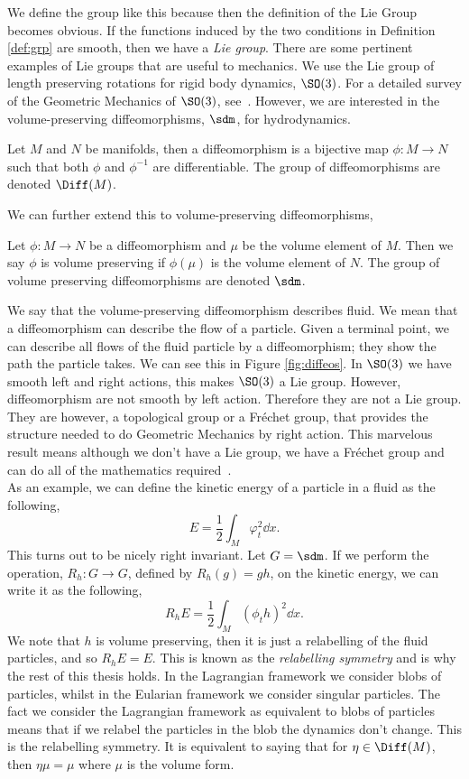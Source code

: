 \noindent
We define the group like this because then the definition of the Lie Group becomes obvious. If the functions induced by the two conditions in Definition \ref{def:grp} are smooth, then we have a \textit{Lie group}. There are some pertinent examples of Lie groups that are useful to mechanics. We use the Lie group of length preserving rotations for rigid body dynamics, $\SO(3)$. For a detailed survey of the Geometric Mechanics of $\SO(3)$, see~\cite{arthur}. However, we are interested in the volume-preserving diffeomorphisms, $\sdm$, for hydrodynamics.
\begin{ndefi}[Diffeomorphism]
  Let $M$ and $N$ be manifolds, then a diffeomorphism is a bijective map $\phi: M \to N$ such that both $\phi$ and $\phi^{-1}$ are differentiable. The group of diffeomorphisms are denoted $\Diff(M)$.
\end{ndefi}
\noindent
We can further extend this to volume-preserving diffeomorphisms,
\begin{ndefi}
  Let $\phi : M \to N$ be a diffeomorphism and $\mu$ be the volume element of $M$. Then we say $\phi$ is volume preserving if $\phi(\mu)$ is the volume element of $N$. The group of volume preserving diffeomorphisms are denoted $\sdm$.
\end{ndefi}
\noindent
We say that the volume-preserving diffeomorphism describes fluid. We mean that a diffeomorphism can describe the flow of a particle. Given a terminal point, we can describe all flows of the fluid particle by a diffeomorphism; they show the path the particle takes. We can see this in Figure \ref{fig:diffeos}. In $\SO(3)$ we have smooth left and right actions, this makes $\SO(3)$ a Lie group. However, diffeomorphism are not smooth by left action. Therefore they are not a Lie group. They are however, a topological group or a Fr\'echet group, that provides the structure needed to do Geometric Mechanics by right action. This marvelous result means although we don't have a Lie group, we have a Fr\'echet group and can do all of the mathematics required~\cite{tatclg}. \\

\noindent
As an example, we can define the kinetic energy of a particle in a fluid as the following,
$$ E = \frac{1}{2}\int_M \varphi_t^2 \dd x. $$
This turns out to be nicely right invariant. Let $G = \sdm$. If we perform the operation, $R_h : G \to G$, defined by $R_h(g) = gh$, on the kinetic energy, we can write it as the following,
$$ R_hE = \frac{1}{2}\int_M (\phi_t h)^2 \dd x. $$
We note that $h$ is volume preserving, then it is just a relabelling of the fluid particles, and so $R_hE = E$. This is known as the \textit{relabelling symmetry} and is why the rest of this thesis holds. In the Lagrangian framework we consider blobs of particles, whilst in the Eularian framework we consider singular particles. The fact we consider the Lagrangian framework as equivalent to blobs of particles means that if we relabel the particles in the blob the dynamics don't change. This is the relabelling symmetry. It is equivalent to saying that for $\eta \in \Diff(M)$, then $\eta\mu = \mu$ where $\mu$ is the volume form.\\

